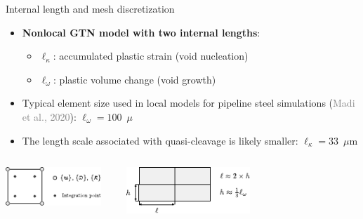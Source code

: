 \documentclass[9pt]{beamer}
\begin{document}

\begin{frame}{Internal length and mesh discretization}

    \begin{itemize}
        \item \textbf{Nonlocal GTN model with two internal lengths}: 
        \vspace{0.15cm}
        \begin{itemize}
        	\item $\ell_{\kappa}$: accumulated plastic strain (void nucleation)
        \vspace{0.15cm}
        \item $\ell_{\omega}$: plastic volume change (void growth)
        \end{itemize}
        \vspace{0.15cm}
        \item Typical element size used in local models for pipeline
steel simulations (\textcolor{gray}{Madi et al., 2020}): $\ell_{\omega} = 100$~$\mu$
\vspace{0.15cm}
		\item The length scale associated with quasi-cleavage is
likely smaller: $\ell_{\kappa} = 33$~$\mu$m
    \end{itemize}

    \vspace{0.7cm}

    \begin{columns}
        \centering
        \includegraphics[width=0.9\textwidth]{Images/nlgeom_si_ig.pdf}
        
        \centering
        \includegraphics[width=0.9\textwidth]{Images/internal_length.pdf}
    \end{columns}

\end{frame}
\end{document}

